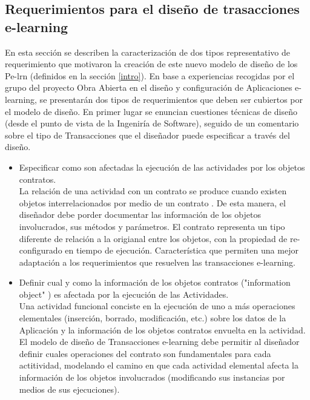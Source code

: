 \documentclass[12 pt,a4paper]{llncs}
\begin{document}
\subsection{Requerimientos para el diseño de trasacciones e-learning}

En esta sección se describen la caracterización de dos tipos representativo de requerimiento que motivaron la creación de este nuevo modelo de diseño de los Pe-lrn (definidos en la sección \ref{intro}). En base a experiencias recogidas por el grupo del proyecto Obra Abierta en el diseño y configuración de Aplicaciones e-learning, se presentarán dos tipos de requerimientos que deben ser cubiertos por el modelo de diseño. En primer lugar se enuncian cuestiones técnicas de diseño (desde el punto de vista de la Ingeniría de Software), seguido de un comentario sobre el tipo de Transacciones que el diseñador puede especificar a través del diseño.

\begin{itemize}

\item Especificar como son afectadas la ejecución de las actividades por los objetos contratos. 
\\

La relación de una actividad con un contrato se produce cuando existen objetos interrelacionados por medio de un contrato \cite{fiadeiro}. De esta manera, el diseñador debe porder documentar las información de los objetos involucrados, sus métodos y parámetros. El contrato representa un tipo diferente de relación a la origianal entre los objetos, con la propiedad de re-configurado en tiempo de ejecución. Característica que permiten una mejor adaptación a los requerimientos que resuelven las transacciones e-learning.

\item  Definir cual y como la  información de los objetos contratos ("information object" \cite{informationobject}) es afectada por la ejecución de las Actividades.
\\

Una actividad funcional conciste en la ejecución de uno a más operaciones elementales (inserción, borrado, modificación, etc.) sobre los datos de la Aplicación y la información de los objetos contratos envuelta en la actividad. El modelo de diseño de Transacciones e-learning debe permitir al diseñador definir cuales operaciones del contrato son fundamentales para cada actitividad, modelando el camino en que cada actividad elemental afecta la información de los objetos involucrados (modificando sus instancias por medios de sus ejecuciones).
\end{itemize}
\end{document}
